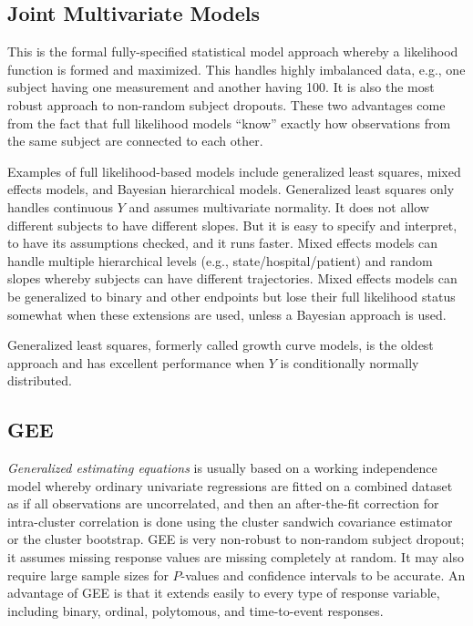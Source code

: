 \subsection{Joint Multivariate Models}\ipacue
This is the formal fully-specified statistical model approach whereby
a likelihood function is formed and maximized.  This handles highly
imbalanced data, e.g., one subject having one measurement and another
having 100.  It is also the most robust approach to non-random subject
dropouts.  These two advantages come from the fact that full
likelihood models ``know'' exactly how observations from the same
subject are connected to each other.

Examples of full likelihood-based models include
generalized least squares, mixed effects models, and Bayesian hierarchical
models.  Generalized least
squares only handles continuous $Y$ and assumes multivariate
normality.  It does not allow different subjects to have different
slopes.  But it is easy to specify and interpret, to have its assumptions
checked, and it runs faster.
Mixed effects models can handle multiple hierarchical levels (e.g.,
state/hospital/patient) and random slopes whereby subjects can
have different trajectories.  Mixed effects models can be generalized
to binary and other endpoints but lose their full likelihood status
somewhat when these extensions are used, unless a Bayesian approach is used.

Generalized least squares, formerly called growth curve models, is the
oldest approach and has excellent performance when $Y$ is
conditionally normally distributed.

\subsection{GEE}\ipacue
\emph{Generalized estimating equations} is usually based on a working
independence model whereby ordinary univariate regressions are fitted on a
combined dataset as if all observations are uncorrelated, and then an
after-the-fit correction for intra-cluster
correlation is done using the cluster sandwich covariance estimator or the
cluster bootstrap.  GEE is very non-robust to non-random subject dropout; it
assumes missing response values are missing completely at random.  It
may also require large sample sizes for
$P$-values and confidence intervals to be accurate.  An advantage of GEE is
that it extends easily to every type of response variable, including binary,
ordinal, polytomous, and time-to-event responses.

